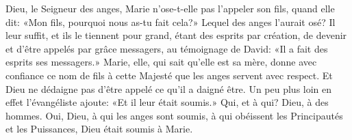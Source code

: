 Dieu, le Seigneur des anges,
	Marie n'ose-t-elle pas l'appeler son fils, quand elle dit:
	«Mon fils, pourquoi nous as-tu fait cela?»
	Lequel des anges l'aurait osé?
Il leur suffit, et ils le tiennent pour grand, étant des esprits par création,	 
	de devenir et d'être appelés par grâce messagers, au témoignage de David:
	«Il a fait des esprits ses messagers.»	 
Marie, elle, qui sait qu'elle est sa mère,
	donne avec confiance ce nom de fils à cette Majesté
	que les anges servent avec respect.
Et Dieu ne dédaigne pas d'être appelé ce qu'il a daigné être.
Un peu plus loin en effet l'évangéliste ajoute:	 
	«Et il leur était soumis.»
Qui, et à qui?
	Dieu, à des hommes.
Oui, Dieu, à qui les anges sont soumis,
	à qui obéissent les Principautés et les Puissances,
	Dieu était soumis à Marie.
